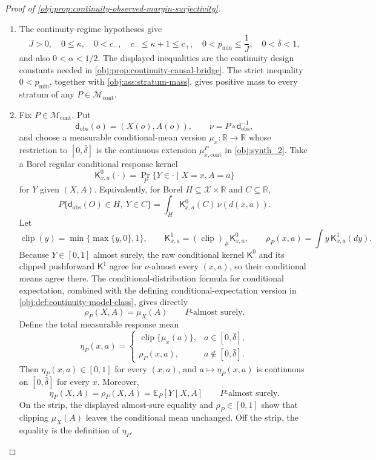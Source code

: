 \begin{proof}[Proof of \cref{obj:prop:continuity-observed-margin-surjectivity}]
\begin{enumerate}
\item The continuity-regime hypotheses give
\[
J>0,\quad 0\le \kappa,\quad 0<c_-,\quad c_-\le \kappa+1\le c_+,\quad
0<p_{\min}\le \frac1J,\quad 0<\bar\delta<1,
\]
and also \(0<\alpha<1/2\).  The displayed inequalities are the continuity design constants needed in \cref{obj:prop:continuity-causal-bridge}.  The strict inequality \(0<p_{\min}\), together with \cref{obj:ass:stratum-mass}, gives positive mass to every stratum of any \(P\in\mathcal M_{\mathrm{cont}}\). %

\item Fix \(P\in\mathcal M_{\mathrm{cont}}\).  Put
\[
\mathsf d_{\mathrm{obs}}(o)=(X(o),A(o)),\qquad
\nu=P\circ\mathsf d_{\mathrm{obs}}^{-1},
\]
and choose a measurable conditional-mean version \(\mu_x:\mathbb R\to\mathbb R\) whose restriction to \([0,\bar\delta]\) is the continuous extension \(\mu_{x,\mathrm{cont}}^P\) in \cref{obj:synth_2}.  Take a Borel regular conditional response kernel
\[
\mathsf K^0_{x,a}(\cdot)=\Pr_P\{Y\in\cdot\mid X=x,A=a\}
\]
for \(Y\) given \((X,A)\).  Equivalently, for Borel \(H\subseteq\mathcal X\times\mathbb R\) and \(C\subseteq\mathbb R\),
\[
P\{\mathsf d_{\mathrm{obs}}(O)\in H,\ Y\in C\}
=
\int_H \mathsf K^0_{x,a}(C)\,\nu(d(x,a)).
\]
Let
\[
\operatorname{clip}(y)=\min\{\max\{y,0\},1\},\qquad
\mathsf K^1_{x,a}=(\operatorname{clip})_{\#}\mathsf K^0_{x,a},\qquad
\rho_P(x,a)=\int y\,\mathsf K^1_{x,a}(dy).
\]
Because \(Y\in[0,1]\) almost surely, the raw conditional kernel \(\mathsf K^0\) and its clipped pushforward \(\mathsf K^1\) agree for \(\nu\)-almost every \((x,a)\), so their conditional means agree there.  The conditional-distribution formula for conditional expectation, combined with the defining conditional-expectation version in \cref{obj:def:continuity-model-class}, gives directly
\[
\rho_P(X,A)=\mu_X(A)
\qquad P\text{-almost surely}.
\]
Define the total measurable response mean
\[
\eta_P(x,a)=
\begin{cases}
\operatorname{clip}\{\mu_x(a)\}, & a\in[0,\bar\delta],\\
\rho_P(x,a), & a\notin[0,\bar\delta].
\end{cases}
\]
Then \(\eta_P(x,a)\in[0,1]\) for every \((x,a)\), and \(a\mapsto\eta_P(x,a)\) is continuous on \([0,\bar\delta]\) for every \(x\).  Moreover,
\[
\eta_P(X,A)=\rho_P(X,A)=\mathbb E_P[Y\mid X,A]
\qquad P\text{-almost surely}.
\]
On the strip, the displayed almost-sure equality and \(\rho_P\in[0,1]\) show that clipping \(\mu_X(A)\) leaves the conditional mean unchanged.  Off the strip, the equality is the definition of \(\eta_P\). %


\end{enumerate}
\end{proof}
